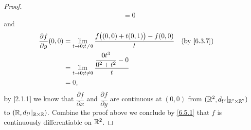 \begin{proof}
\begin{align*}
                                         & = 0
  \end{align*}
  and
  \begin{align*}
    \dfrac{\partial f}{\partial y}(0, 0) & = \lim_{t \to 0 ; t \neq 0} \dfrac{f\big((0, 0) + t(0, 1)\big) - f(0, 0)}{t} &  & \by{6.3.7} \\
                                         & = \lim_{t \to 0 ; t \neq 0} \dfrac{\dfrac{0 t^3}{0^2 + t^2} - 0}{t}                          \\
                                         & = 0,
  \end{align*}
  by \cref{2.1.1} we know that \(\dfrac{\partial f}{\partial x}\) and \(\dfrac{\partial f}{\partial y}\) are continuous at \((0, 0)\) from \((\mathbb{R}^2, d_{l^2}|_{\mathbb{R}^2 \times \mathbb{R}^2})\) to \((\mathbb{R}, d_{l^1}|_{\mathbb{R} \times \mathbb{R}})\).
  Combine the proof above we conclude by \cref{6.5.1} that \(f\) is continuously differentiable on \(\mathbb{R}^2\).


\end{proof}
